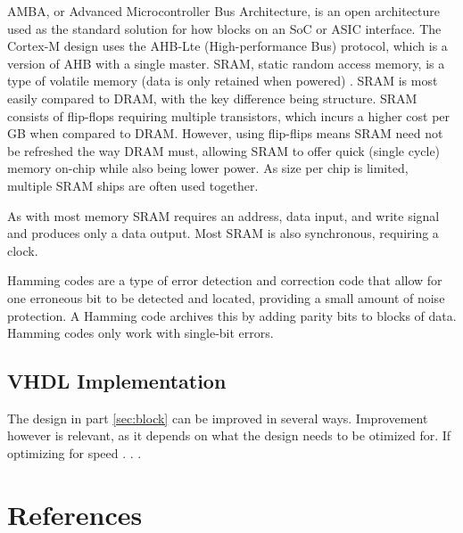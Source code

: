 \documentclass[11pt]{article}
\begin{document}
AMBA, or Advanced Microcontroller Bus Architecture, is an open architecture used as the standard solution for how blocks on an SoC or ASIC interface\cite{amba}.
The Cortex-M design uses the AHB-Lte (High-performance Bus) protocol, which is a version of AHB with a single master.
SRAM, static random access memory, is a type of volatile memory (data is only retained when powered) \cite{dally}. 
SRAM is most easily compared to DRAM, with the key difference being structure.
SRAM consists of flip-flops requiring multiple transistors, which incurs a higher cost per GB when compared to DRAM.
However, using flip-flips means SRAM need not be refreshed the way DRAM must, allowing SRAM to offer quick (single cycle) memory on-chip while also being lower power.
As size per chip is limited, multiple SRAM ships are often used together.


As with most memory SRAM requires an address, data input, and write signal and produces only a data output. Most SRAM is also synchronous, requiring a clock.

Hamming codes are a type of error detection and correction code that allow for one erroneous bit to be detected and located, providing a small amount of noise protection.
A Hamming code archives this by adding parity bits to blocks of data.
Hamming codes only work with single-bit errors. \cite{hamming} \cite{ham}

\subsection{VHDL Implementation}

The design in part \ref{sec:block} can be improved in several ways.
Improvement however is relevant, as it depends on what the design needs to be otimized for.
If optimizing for speed . . . 

\pagebreak
\appendix
\renewcommand{\thesection}{\Roman{section}}
\section{References}
\printbibliography[heading=none]
\end{document}

